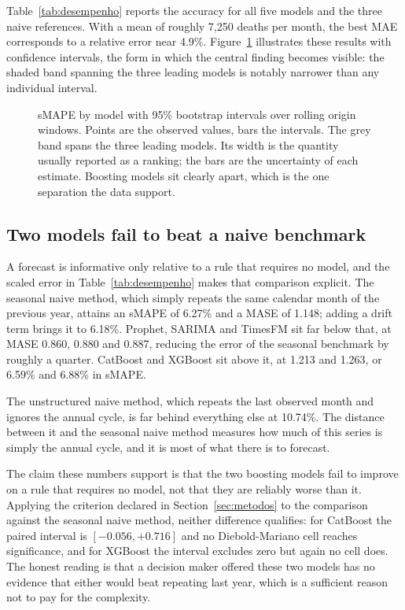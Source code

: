 Table~\ref{tab:desempenho} reports the accuracy for all five models and the three naive
references. With a mean of roughly 7{,}250 deaths per month, the best MAE corresponds to a
relative error near 4.9\%. Figure~\ref{fig:smape} illustrates these results with confidence
intervals, the form in which the central finding becomes visible: the shaded band spanning
the three leading models is notably narrower than any individual interval.

\begin{figure}[htbp]
\centering

\caption{sMAPE by model with 95\% bootstrap intervals over rolling origin windows. Points
are the observed values, bars the intervals. The grey band spans the three leading models.
Its width is the quantity usually reported as a ranking; the bars are the uncertainty of
each estimate. Boosting models sit clearly apart, which is the one separation the data
support.}
\label{fig:smape}
\end{figure}

\subsection{Two models fail to beat a naive benchmark}\label{sec:naive}

A forecast is informative only relative to a rule that requires no model, and the scaled
error in Table~\ref{tab:desempenho} makes that comparison explicit. The seasonal naive
method, which simply repeats the same calendar month of the previous year, attains an sMAPE
of 6.27\% and a MASE of 1.148; adding a drift term brings it to 6.18\%. Prophet, SARIMA and
TimesFM sit far below that, at MASE 0.860, 0.880 and 0.887, reducing the error of the
seasonal benchmark by roughly a quarter. CatBoost and XGBoost sit above it, at 1.213 and
1.263, or 6.59\% and 6.88\% in sMAPE.

The unstructured naive method, which repeats the last observed month and ignores the annual
cycle, is far behind everything else at 10.74\%. The distance between it and the seasonal
naive method measures how much of this series is simply the annual cycle, and it is most of
what there is to forecast.

The claim these numbers support is that the two boosting models fail to improve on a rule
that requires no model, not that they are reliably worse than it. Applying the criterion
declared in Section~\ref{sec:metodos} to the comparison against the seasonal naive method,
neither difference qualifies: for CatBoost the paired interval is $[-0.056, +0.716]$ and no
Diebold-Mariano cell reaches significance, and for XGBoost the interval excludes zero but
again no cell does. The honest reading is that a decision maker offered these two models has
no evidence that either would beat repeating last year, which is a sufficient reason not to
pay for the complexity.

